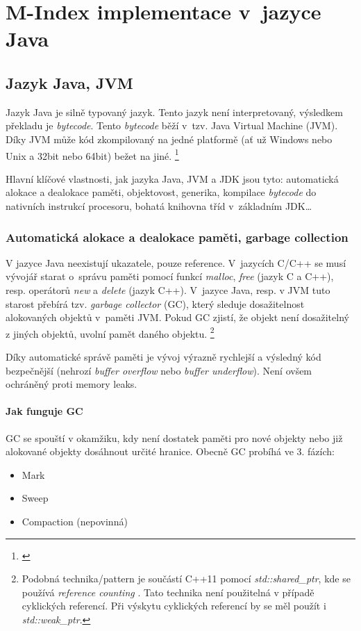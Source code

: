 \chapter{M-Index implementace v~jazyce Java}


\section{Jazyk Java, JVM}

Jazyk Java je silně typovaný jazyk. Tento jazyk není interpretovaný,
výsledkem překladu je \emph{bytecode}. Tento \emph{bytecode} běží
v~tzv. Java Virtual Machine (JVM).
Díky JVM může kód zkompilovaný na jedné platformě (ať už Windows nebo Unix a 32bit nebo 64bit) bežet na jiné. \footnote{\emph{}\cite{lindholm2013java}}

Hlavní klíčové vlastnosti, jak jazyka Java, JVM a JDK
jsou tyto: automatická alokace a dealokace paměti, objektovost, generika,
kompilace \emph{bytecode} do nativních instrukcí procesoru, bohatá
knihovna tříd v~základním JDK\ldots{}


\subsection{Automatická alokace a dealokace paměti, garbage collection}

V jazyce Java neexistují ukazatele, pouze reference. V~jazycích C/C++
se musí vývojář starat o~správu paměti pomocí funkcí \emph{malloc},
\emph{free} (jazyk C a C++), resp. operátorů \emph{new} a \emph{delete}
(jazyk C++). V~jazyce Java, resp. v JVM \cite{lindholm2013java} tuto starost přebírá tzv. \emph{garbage
collector} (GC), který sleduje
dosažitelnost alokovaných objektů v~paměti JVM. Pokud GC
zjistí, že objekt není dosažitelný z jiných objektů, uvolní pamět daného objektu.
\footnote{Podobná technika/pattern je součástí C++11 pomocí \emph{std::shared\_ptr},
kde se používá \emph{reference counting} \cite{ISO:2012:CPP}. Tato technika není použitelná v případě cyklických referencí. Při výskytu cyklických referencí by se měl použít i \emph{std::weak\_ptr}.
}

Díky automatické správě paměti je vývoj výrazně rychlejší a výsledný
kód bezpečnější (nehrozí \emph{buffer overflow} nebo \emph{buffer underflow}). Není ovšem ochráněný proti
memory leaks.

\subsubsection{Jak funguje GC}
GC se spouští v okamžiku, kdy není dostatek paměti pro nové objekty nebo již alokované objekty dosáhnout určité hranice. Obecně GC probíhá ve 3. fázích:
\begin{itemize}
  \item Mark
  \item Sweep
  \item Compaction (nepovinná)
\end{itemize}

